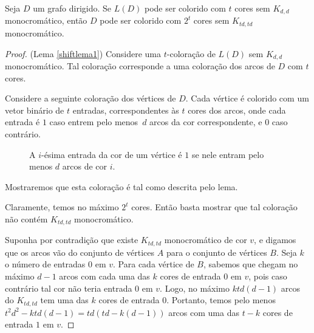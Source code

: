 \begin{lema}\label{shiftlema1}
Seja $D$ um grafo dirigido. Se $L(D)$ pode ser colorido com $t$ cores sem $K_{d,d}$ monocromático, então $D$ pode ser colorido com $2^t$ cores sem $K_{td,td}$ monocromático.
\end{lema}

\begin{proof}{(Lema \ref{shiftlema1})}
Considere uma $t$-coloração de $L(D)$ sem $K_{d,d}$ monocromático. Tal coloração corresponde a uma coloração dos arcos de $D$ com $t$ cores.

Considere a seguinte coloração dos vértices de $D$. Cada vértice é colorido com um vetor binário de $t$ entradas, correspondentes às $t$ cores dos arcos, onde cada entrada é $1$ caso entrem pelo menos~$d$ arcos da cor correspondente, e $0$ caso contrário.

\begin{figure}[H]
\centering
{}
\caption{A $i$-ésima entrada da cor de um vértice é $1$ se nele entram pelo menos $d$ arcos de cor $i$.}
\label{fig:shiftarccoloringtovertex}
\end{figure}

Mostraremos que esta coloração é tal como descrita pelo lema. 

Claramente, temos no máximo $2^t$ cores. Então basta mostrar que tal coloração não contém $K_{td,td}$ monocromático.

Suponha por contradição que existe $K_{td,td}$ monocromático de cor $v$, e digamos que os arcos vão do conjunto de vértices $A$ para o conjunto de vértices $B$. Seja $k$ o número de entradas $0$ em $v$. Para cada vértice de $B$, sabemos que chegam no máximo $d-1$ arcos com cada uma das $k$ cores de entrada $0$ em $v$, pois caso contrário tal cor não teria entrada $0$ em $v$. Logo, no máximo $ktd(d-1)$ arcos do $K_{td,td}$ tem uma das $k$ cores de entrada $0$. Portanto, temos pelo menos $t^2d^2 - ktd(d-1) = td(td - k(d-1))$ arcos com uma das $t-k$ cores de entrada $1$ em $v$.


\end{proof}
